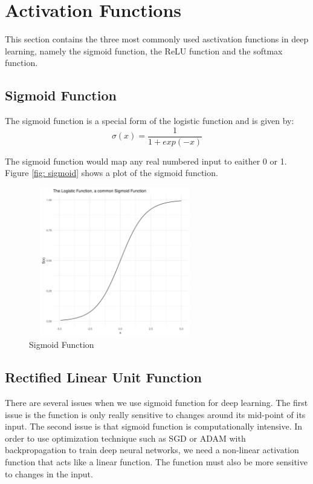 \section{Activation Functions}
This section contains the three most commonly used asctivation functions in deep learning, namely the sigmoid function, the ReLU function and the softmax function.
\subsection{Sigmoid Function}
The sigmoid function is a special form of the logistic function and is given by:
\begin{equation}
    \sigma (x) = \frac{1}{1+exp(-x)}
\end{equation}

The sigmoid function would map any real numbered input to eaither 0 or 1. Figure \ref{fig: sigmoid} shows a plot of the sigmoid function.

\begin{figure}[ht]
\includegraphics[width=7.5cm, height=6.5cm]{images/sigmoid.jpg}
\centering
\caption{Sigmoid Function}
\label{fig:sigmoid}
\end{figure}
\FloatBarrier


\subsection{Rectified Linear Unit Function}

There are several issues when we use sigmoid function for deep learning. The first issue is the function is only really sensitive to changes around its mid-point of its input. The second issue is that sigmoid function is computationally intensive. In order to use optimization technique such as SGD or ADAM with backpropagation  to train deep neural networks, we need a non-linear activation function that acts like a linear function. The function must also be more sensitive to changes in the input.

